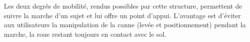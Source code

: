 Les deux degrés de mobilité, rendus possibles par cette structure, permettent de suivre la marche d'un sujet et lui offre un point d'appui. L'avantage est d'éviter aux utilisateurs la manipulation de la canne (levée et positionnement) pendant la marche, la roue restant toujours en contact avec le sol.
%
%
%
%  
%  
%  
%  
%  
%  
%  
